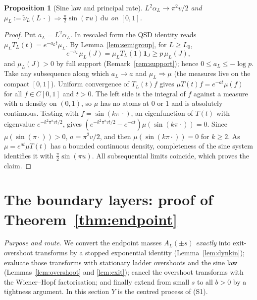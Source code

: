 \documentclass[11pt,a4paper]{article}
\newtheorem{proposition}[theorem]{Proposition}
\theoremstyle{definition}
\theoremstyle{remark}
\newcommand{\1}{\mathbf 1}
\newcommand{\dd}{\,\mathrm d}
\begin{document}
\begin{proposition}[Sine law and principal rate]\label{prop:sine}
$L^2\alpha_L\to\pi^2v/2$ and $\mu_L:=\widetilde\nu_L(L\,\cdot)\Rightarrow\frac\pi2\sin(\pi u)\dd u$ on $[0,1]$.
\end{proposition}
\begin{proof}
Put $a_L=L^2\alpha_L$. In rescaled form the QSD identity reads $\mu_LT_L(t)=e^{-a_Lt}\mu_L$. By Lemma~\ref{lem:semigroup}, for $L\ge L_0$,
\[
 e^{-a_L}\mu_L(J)=\mu_LT_L(1)\1_J\ge p\,\mu_L(J),
\]
and $\mu_L(J)>0$ by full support (Remark~\ref{rem:support}); hence $0\le a_L\le-\log p$. Take any subsequence along which $a_L\to a$ and $\mu_L\Rightarrow\mu$ (the measures live on the compact $[0,1]$). Uniform convergence of $T_L(t)f$ gives $\mu T(t)f=e^{-at}\mu(f)$ for all $f\in C[0,1]$ and $t>0$. The left side is the integral of $f$ against a measure with a density on $(0,1)$, so $\mu$ has no atoms at $0$ or $1$ and is absolutely continuous. Testing with $f=\sin(k\pi\,\cdot)$, an eigenfunction of $T(t)$ with eigenvalue $e^{-k^2\pi^2vt/2}$, gives $(e^{-k^2\pi^2vt/2}-e^{-at})\mu(\sin(k\pi\cdot))=0$. Since $\mu(\sin(\pi\cdot))>0$, $a=\pi^2v/2$, and then $\mu(\sin(k\pi\cdot))=0$ for $k\ge2$. As $\mu=e^{at}\mu T(t)$ has a bounded continuous density, completeness of the sine system identifies it with $\frac\pi2\sin(\pi u)$. All subsequential limits coincide, which proves the claim.
\end{proof}

\section{The boundary layers: proof of Theorem~\ref{thm:endpoint}}\label{sec:boundary}
\emph{Purpose and route.} We convert the endpoint masses $A_L(\pm s)$ \emph{exactly} into exit-overshoot transforms by a stopped exponential identity (Lemma~\ref{lem:dynkin}); evaluate those transforms with stationary ladder overshoots and the sine law (Lemmas~\ref{lem:overshoot} and \ref{lem:exit}); cancel the overshoot transforms with the Wiener--Hopf factorisation; and finally extend from small $s$ to all $b>0$ by a tightness argument. In this section $Y$ is the centred process of (S1).
\end{document}
